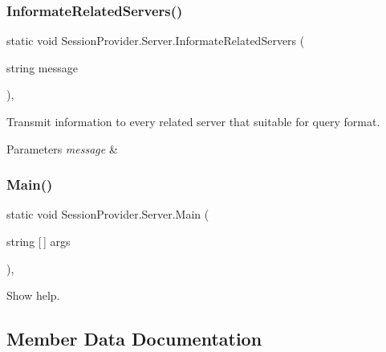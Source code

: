 \subsubsection{\texorpdfstring{Informate\+Related\+Servers()}{InformateRelatedServers()}}
{\footnotesize\ttfamily static void Session\+Provider.\+Server.\+Informate\+Related\+Servers (\begin{DoxyParamCaption}\item[{string}]{message }\end{DoxyParamCaption})\hspace{0.3cm}{\ttfamily [static]}, {\ttfamily [private]}}



Transmit information to every related server that suitable for query format. 


\begin{DoxyParams}{Parameters}
{\em message} & \\
\hline
\end{DoxyParams}
\mbox{\label{class_session_provider_1_1_server_a78068e966b78f7579b01ba80f53b87ea}} 
\subsubsection{\texorpdfstring{Main()}{Main()}}
{\footnotesize\ttfamily static void Session\+Provider.\+Server.\+Main (\begin{DoxyParamCaption}\item[{string \mbox{[}$\,$\mbox{]}}]{args }\end{DoxyParamCaption})\hspace{0.3cm}{\ttfamily [static]}, {\ttfamily [private]}}

Show help. 

\subsection{Member Data Documentation}
\mbox{\label{class_session_provider_1_1_server_a1738a442f750af35694a05d7cfdb4a71}} 
